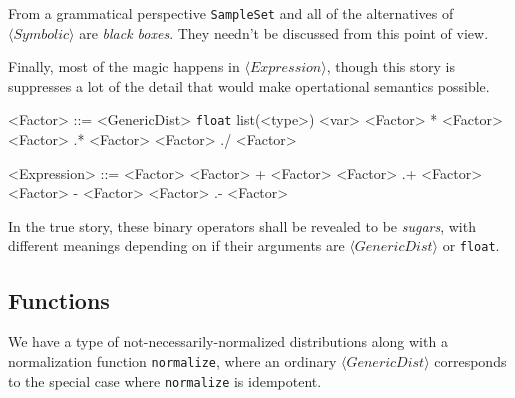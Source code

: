\documentclass[../main.tex]{subfiles}
\begin{document}
From a grammatical perspective \texttt{SampleSet} and all of the alternatives of $\langle \textit{Symbolic} \rangle$ are \textit{black boxes}. They needn't be discussed from this point of view.

Finally, most of the magic happens in $\langle \textit{Expression} \rangle$, though this story is suppresses a lot of the detail that would make opertational semantics possible.

\begin{grammar}
  <Factor> ::= <GenericDist> \alt \texttt{float} \alt list(<type>) \alt <var> \alt <Factor> * <Factor> \alt <Factor> .* <Factor> \alt <Factor> ./ <Factor>

  <Expression> ::= <Factor> \alt <Factor> + <Factor> \alt <Factor> .+ <Factor> \alt <Factor> - <Factor> \alt <Factor> .- <Factor>
\end{grammar}\label{gram:expr}

In the true story, these binary operators shall be revealed to be \textit{sugars}, with different meanings depending on if their arguments are $\langle \textit{GenericDist} \rangle$ or \texttt{float}.

\subsection{Functions}

We have a type of not-necessarily-normalized distributions along with a normalization function \texttt{normalize}, where an ordinary $\langle \textit{GenericDist} \rangle$ corresponds to the special case where \texttt{normalize} is idempotent.
\end{document}
